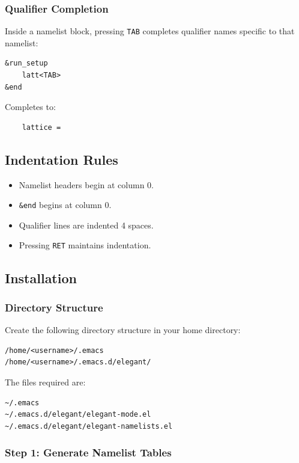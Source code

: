 \subsubsection{Qualifier Completion}

Inside a namelist block, pressing \texttt{TAB} completes qualifier names
specific to that namelist:
\begin{lstlisting}
&run_setup
    latt<TAB>
&end
\end{lstlisting}
Completes to:
\begin{lstlisting}
    lattice =
\end{lstlisting}

\subsection{Indentation Rules}

\begin{itemize}[noitemsep]
\item Namelist headers begin at column 0.
\item \texttt{\&end} begins at column 0.
\item Qualifier lines are indented 4 spaces.
\item Pressing \texttt{RET} maintains indentation.
\end{itemize}

\subsection{Installation}

\subsubsection{Directory Structure}

Create the following directory structure in your home directory:
\begin{lstlisting}
/home/<username>/.emacs
/home/<username>/.emacs.d/elegant/
\end{lstlisting}

The files required are:
\begin{lstlisting}
~/.emacs
~/.emacs.d/elegant/elegant-mode.el
~/.emacs.d/elegant/elegant-namelists.el
\end{lstlisting}

\subsubsection{Step 1: Generate Namelist Tables}

